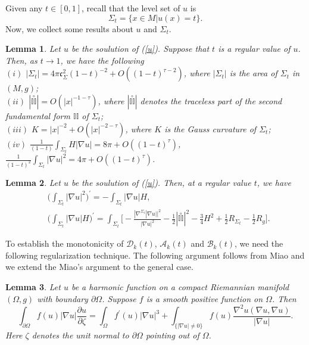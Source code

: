 \documentclass[12pt]{article}
\theoremstyle{definition}
\theoremstyle{plain}
\newtheorem{lemma}{Lemma}[section]
\numberwithin{equation}{section}
\begin{document}
Given any $ t\in [0,1] $, recall that the level set of $ u $ is
$$ 
\Sigma_{t}=\{x\in M| u(x)=t\}. 
$$ 
Now, we collect some results about $ u $ and $ \Sigma_{t} $.  
\begin{lemma}\cite{Miao}\label{funda u}
Let $ u $ be the soulution of (\ref{u}). Suppose that $ t $ is a regular value of $ u $. Then, as $ t\to 1 $, we have the following
\\
$ (i) $ $ |\Sigma_{t}|=4\pi \mathfrak{c}_{\Sigma}^{2}(1-t)^{-2}+O((1-t)^{\tau-2}) $, where $ |\Sigma_{t}| $ is the area of $ \Sigma_{t} $ in $ (M,g) $;
\\
$ (ii) $ $ |\overset{\circ}{\mathbb{II}}|=O(|x|^{-1-\tau}) $, where $ |\overset{\circ}{\mathbb{II}}| $ denotes the traceless part of the second fundamental form $ \mathbb{II} $ of $ \Sigma_{t} $;
\\
$ (iii) $ $ K=|x|^{-2}+O(|x|^{-2-\tau}) $, where $ K $ is the Gauss curvature of $ \Sigma_{t} $;
\\
$ (iv) $ $\frac{1}{(1-t)}\int_{\Sigma_{t}}H|\nabla u|=8\pi+O((1-t)^{\tau})$, $\frac{1}{(1-t)^{2}}\int_{\Sigma_{t}}|\nabla u|^{2}=4\pi+O((1-t)^{\tau})$.
\end{lemma}
\begin{lemma}\cite{Miao}\label{deriva}
Let $ u $ be the soulution of (\ref{u}). Then, at a regular value $ t $, we have 
\begin{equation}
\begin{aligned}
&\Big(\int_{\Sigma_{t}}|\nabla u|^{2}\Big)^{\prime}=-\int_{\Sigma_{t}}|\nabla u|H,\\
&\Big(\int_{\Sigma_{t}}|\nabla u|H\Big)^{\prime}=\int_{\Sigma_{t}}\Big[-\frac{|\nabla^{\Sigma_{t}}|\nabla u||^{2}}{|\nabla u|^{2}}-\frac{1}{2}|\overset{\circ}{\mathbb{II}}|^{2}-\frac{3}{4}H^{2}+\frac{1}{2}R_{\Sigma_{t}}-\frac{1}{2}R_{g} \Big].
\end{aligned}
\end{equation}
\end{lemma}
To establish the monotonicity of $ \mathcal{D}_{k}(t) $, $ \mathcal{A}_{k}(t) $ and $ \mathcal{B}_{k}(t) $, we need the following regularization technique. The following argument follows from Miao \cite{Miao} and we extend the Miao's argument \cite{Miao} to the general case.
\begin{lemma}\label{f(u)1}
Let $ u $ be a harmonic function on a compact Riemannian manifold $ (\Omega,g) $ with boundary $ \partial \Omega $. Suppose $ f $ is a smooth positive function on $ \Omega $. Then
\begin{equation}
\int_{\partial \Omega}f(u)|\nabla u|\frac{\partial u}{\partial \zeta}=\int_{\Omega}f^{\prime}(u)|\nabla u|^{3}+\int_{\{|\nabla u|\neq 0\}} f(u)\frac{\nabla^{2}u(\nabla u,\nabla u)}{|\nabla u|}.
\end{equation}
Here $ \zeta $ denotes the unit normal to $ \partial \Omega $ pointing out of $ \Omega $.
\end{lemma}
\end{document}
